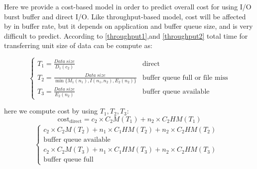 Here we provide a cost-based model in order to predict overall cost for using I/O burst buffer and direct I/O.
Like throughput-based model, cost will be affected by in buffer rate, but it depends on application and buffer queue size, and is very difficult to predict.
According to \ref{throughput1},and \ref{throughput2} total time for transferring unit size of data can be compute as:

\begin{equation}
	\begin{cases}
		T_1=\frac{Data~size}{D_1(c_2)} & \text{direct}\\
		T_2=\frac{Data~size}{\min\{M_1(n_1),I(n_1,n_2),E_2(n_2)\}} &\text{buffer queue full or file miss}\\
		T_3=\frac{Data~size}{E_2(n_2)} &\text{buffer queue available}
	\end{cases}
\end{equation}

here we compute cost by using $T_1,T_2,T_3$:
\begin{equation}
	\text{cost}_\text{direct}=c_2\times C_2M(T_1)+n_2\times C_2HM(T_1)
\end{equation}
\begin{align}
	\begin{cases}
		c_2\times C_2M(T_2)+n_1\times C_1HM(T_2)+n_2\times C_2HM(T_2)&\\
		\text{buffer queue available}&\\
		c_2\times C_2M(T_3)+n_1\times C_1HM(T_3)+n_2\times C_2HM(T_3)&\\
		\text{buffer queue full}&
	\end{cases}
\end{align}


